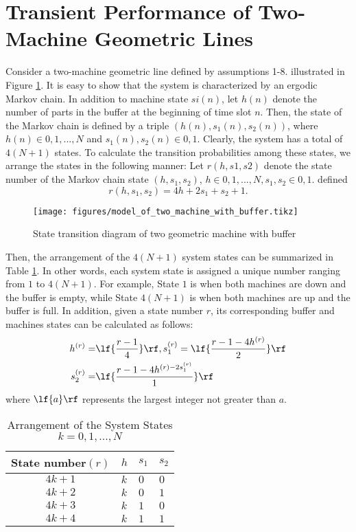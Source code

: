 \section{Transient Performance of Two-Machine Geometric Lines}
\noindent Consider a two-machine geometric line defined by assumptions 1-8. illustrated in Figure \ref{State transition diagram of two geometric machine with buffer}. It is easy to show that the system is characterized by an ergodic Markov chain. In addition to machine state $si(n)$, let $h(n)$ denote the number of parts in the buffer at the beginning of time slot $n$. Then, the state of the Markov chain is defined by a triple $(h(n),s_1(n),s_2(n))$, where $h(n)\in {0,1,...,N}$ and $s_1(n),s_2(n) \in {0,1}$. Clearly, the system has a total of $4(N+1)$ states. To calculate the transition probabilities among these states, we arrange the states in the following manner: Let $r(h,s1,s2)$ denote the state number of the Markov chain state $(h,s_1,s_2)$, $h\in {0,1,...,N}, s_1,s_2\in {0,1}$. defined
\begin{equation}
	r(h,s_1,s_2) = 4h + 2s_1 +s_2 +1 .
	\label{definition of r}
\end{equation}
\begin{figure}[!h]
	\centering
	\texttt{[image: figures/model\_of\_two\_machine\_with\_buffer.tikz]}
	\caption{State transition diagram of two geometric machine with buffer}
	\label{State transition diagram of two geometric machine with buffer}
\end{figure}
Then, the arrangement of the $4(N+1)$ system states can be summarized in Table \ref{two machine state}. In other words, each system state is assigned a unique number ranging from $1$ to $4(N+1)$. For example, State $1$ is when both machines are down and the buffer is empty, while State $4(N+1)$ is when both machines are up and the buffer is full. In addition, given a state number $r$, its corresponding buffer and machines states can be calculated as follows:
\begin{equation}
	\begin{aligned}
		h^{(r)} =& \lf{\frac{r-1}{4}}\rf, s_1^{(r)} = \lf{\frac{r-1-4h^{(r)}}{2}}\rf \\
		s_2^{(r)} =& \lf{\frac{r-1-4h^{(r)-2s_1^{(r)}}}{1}}\rf
	\end{aligned}
\end{equation}
where $\lf{a}\rf$ represents the largest integer not greater than $a$.
\begin{table}[H]
	\centering
	\caption{Arrangement of the System States $k = 0,1,...,N$}
	\begin{tabular}{c|lll}\hline
		State number$(r)$&$h$ & $s_1$  & $s_2$    \\\hline
		$4k+1$ & $k$          & $0$      & $0$      \\
		$4k+2$ & $k$          & $0$      & $1$      \\
		$4k+3$ & $k$          & $1$      & $0$       \\
		$4k+4$ & $k$          & $1$      & $1$         \\\hline
	\end{tabular}
	\label{two machine state}
\end{table}
